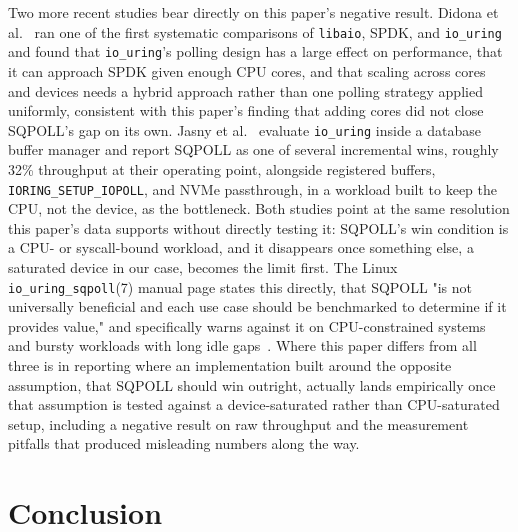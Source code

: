 \documentclass[conference]{IEEEtran}
\begin{document}
Two more recent studies bear directly on this paper's negative result. Didona et
al.~\cite{didona2022} ran one of the first systematic comparisons of \texttt{libaio}, SPDK, and
\texttt{io\_uring} and found that \texttt{io\_uring}'s polling design has a large effect on
performance, that it can approach SPDK given enough CPU cores, and that scaling across cores and
devices needs a hybrid approach rather than one polling strategy applied uniformly, consistent
with this paper's finding that adding cores did not close SQPOLL's gap on its own. Jasny et
al.~\cite{jasny2025} evaluate \texttt{io\_uring} inside a database buffer manager and report
SQPOLL as one of several incremental wins, roughly 32\% throughput at their operating point,
alongside registered buffers, \texttt{IORING\_SETUP\_IOPOLL}, and NVMe passthrough, in a workload
built to keep the CPU, not the device, as the bottleneck. Both studies point at the same
resolution this paper's data supports without directly testing it: SQPOLL's win condition is a
CPU- or syscall-bound workload, and it disappears once something else, a saturated device in our
case, becomes the limit first. The Linux \texttt{io\_uring\_sqpoll}(7) manual page states this
directly, that SQPOLL "is not universally beneficial and each use case should be benchmarked to
determine if it provides value," and specifically warns against it on CPU-constrained systems and
bursty workloads with long idle gaps~\cite{sqpoll-manpage}. Where this paper differs from all
three is in reporting where an implementation built around the opposite assumption, that SQPOLL
should win outright, actually lands empirically once that assumption is tested against a
device-saturated rather than CPU-saturated setup, including a negative result on raw throughput
and the measurement pitfalls that produced misleading numbers along the way.

\section{Conclusion}
\end{document}

